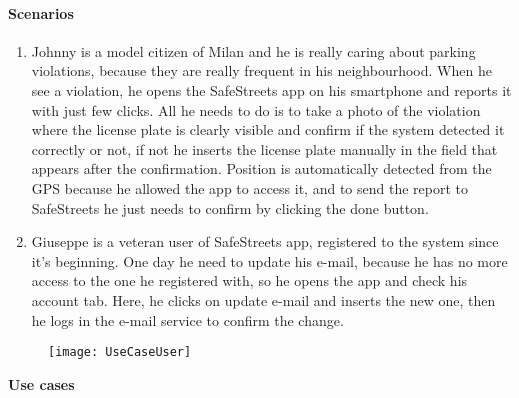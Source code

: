 \paragraph{Scenarios}
    \begin{enumerate}
        \item Johnny is a model citizen of Milan and he is really caring about parking violations, because they are really frequent in his neighbourhood. When he see a violation, he opens the SafeStreets app on his smartphone and reports it with just few clicks. All he needs to do is to take a photo of the violation where the license plate is clearly visible and confirm if the system detected it correctly or not, if not he inserts the license plate manually in the field that appears after the confirmation. Position is automatically detected from the GPS because he allowed the app to access it, and to send the report to SafeStreets he just needs to confirm by clicking the done button.
        
        \item Giuseppe is a veteran user of SafeStreets app, registered to the system since it's beginning. One day he need to update his e-mail, because he has no more access to the one he registered with, so he opens the app and check his account tab. Here, he clicks on update e-mail and inserts the new one, then he logs in the e-mail service to confirm the change.
    \end{enumerate}

\begin{figure}[H]
	\centering
    \texttt{[image: UseCaseUser]}
\end{figure}	
\textbf{Use cases}\\
\vskip 0.2in


